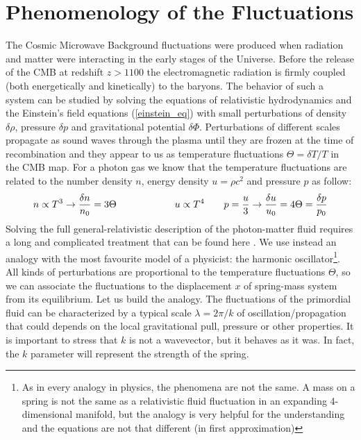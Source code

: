 \documentclass{article}
\begin{document}
\section{Phenomenology of the Fluctuations}
The Cosmic Microwave Background fluctuations were produced when radiation and matter were interacting in the early stages of the Universe.
Before the release of the CMB at redshift $z>1100$ the electromagnetic radiation is firmly coupled (both energetically and kinetically) to the baryons.
The behavior of such a system can be studied by solving the equations of relativistic hydrodynamics and the Einstein's field equations (\ref{einstein_eq}) with small perturbations of density $\delta \rho$, pressure $\delta p$ and gravitational potential  $\delta \Phi$.
Perturbations of different scales propagate as sound waves through the plasma until they are frozen at the time of recombination and they appear to us as temperature fluctuations $\Theta = \delta T /T$ in the CMB map.
For a photon gas we know that the temperature fluctuations are related to the number density $n$, energy density $u = \rho c^2$ and pressure $p$ as follow:
\begin{equation}
n \propto T ^3 \rightarrow \dfrac{\delta n}{n_0} = 3 \Theta \qquad \qquad \qquad
 u \propto T^4  \qquad p  = \dfrac{u}{3} \rightarrow \dfrac{\delta u}{u_0} = 4 \Theta = \dfrac{\delta p}{p_0} \notag
\end{equation}
Solving the full general-relativistic description of the photon-matter fluid requires a long and complicated treatment that can be found here \cite{LecturesPdf,keskitaloEffectMatterBaryon}. We use instead an analogy with the most favourite model of a physicist: the harmonic oscillator\footnote{As in every analogy in physics, the phenomena are not the same. A mass on a spring is not the same as a relativistic fluid fluctuation in an expanding 4-dimensional manifold, but the analogy is very helpful for the understanding and the equations are not that different (in first approximation)}.\\
All kinds of perturbations are proportional to the temperature fluctuations $\Theta$, so we  can associate the fluctuations to the displacement $x$ of spring-mass system from its equilibrium.
Let us build the analogy.
The fluctuations of the primordial fluid can be characterized by a typical scale $\lambda = 2 \pi /k$ of oscillation/propagation that could depends on the local gravitational pull, pressure or other properties.
It is important to stress that $k$ is not a wavevector, but it behaves as it was. 
In fact, the $k$ parameter will represent the strength of the spring.
\end{document}
